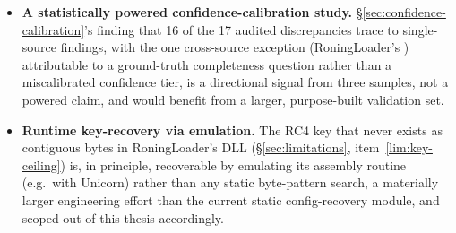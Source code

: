 \begin{itemize}
\item \textbf{A statistically powered confidence-calibration study.}
  \S\ref{sec:confidence-calibration}'s finding that 16 of the 17
  audited discrepancies trace to single-source findings, with the one
  cross-source exception (RoningLoader's ) attributable
  to a ground-truth completeness question rather than a miscalibrated
  confidence tier, is a directional signal from three samples, not a
  powered claim, and would benefit from a larger, purpose-built
  validation set.

\item \textbf{Runtime key-recovery via emulation.} The RC4 key that
  never exists as contiguous bytes in RoningLoader's DLL
  (\S\ref{sec:limitations}, item~\ref{lim:key-ceiling}) is, in principle, recoverable by
  emulating its assembly routine (e.g.\ with Unicorn) rather than any
  static byte-pattern search, a materially larger engineering effort
  than the current static config-recovery module, and scoped out of
  this thesis accordingly.

\end{itemize}
